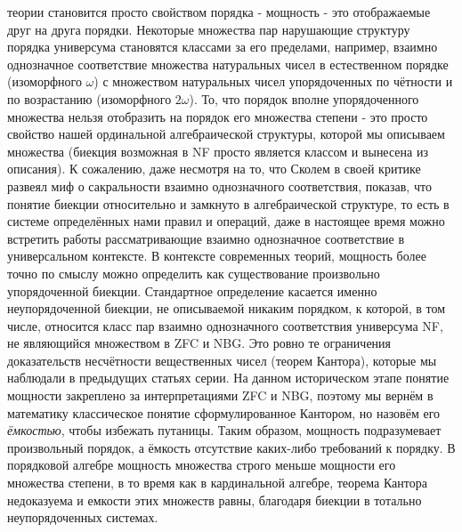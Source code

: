 \documentclass[12pt]{article}
\begin{document}
теории становится просто свойством порядка - мощность - это отображаемые друг на друга порядки. Некоторые множества пар нарушающие структуру порядка универсума становятся классами за его пределами, например, взаимно однозначное соответствие множества натуральных чисел в естественном порядке (изоморфного $\omega$) с множеством натуральных чисел упорядоченных по чётности и по возрастанию (изоморфного $2\omega$). То, что порядок вполне упорядоченного множества нельзя отобразить на порядок его множества степени - это просто свойство нашей ординальной алгебраической структуры, которой мы описываем множества (биекция возможная в NF просто является классом и вынесена из описания). К сожалению, даже несмотря на то, что Сколем в своей критике развеял миф о сакральности взаимно однозначного соответствия, показав, что понятие биекции относительно и замкнуто в алгебраической структуре, то есть в системе определённых нами правил и операций, даже в настоящее время можно встретить работы рассматривающие взаимно однозначное соответствие в универсальном контексте. В контексте современных теорий, мощность более точно по смыслу можно определить как существование произвольно упорядоченной биекции. Стандартное определение касается именно неупорядоченной биекции, не описываемой никаким порядком, к которой, в том числе, относится класс пар взаимно однозначного соответствия универсума NF, не являющийся множеством в ZFC и NBG. Это ровно те ограничения доказательств несчётности вещественных чисел (теорем Кантора), которые мы наблюдали в предыдущих статьях серии. На данном историческом этапе понятие мощности закреплено за интерпретациями ZFC и NBG, поэтому мы вернём в математику классическое понятие сформулированное Кантором, но назовём его {\it ёмкостью}, чтобы избежать путаницы. Таким образом, мощность подразумевает произвольный порядок, а ёмкость отсутствие каких-либо требований к порядку. В порядковой алгебре мощность множества строго меньше мощности его множества степени, в то время как в кардинальной алгебре, теорема Кантора недоказуема и емкости этих множеств равны, благодаря биекции в тотально неупорядоченных системах.
\end{document}
